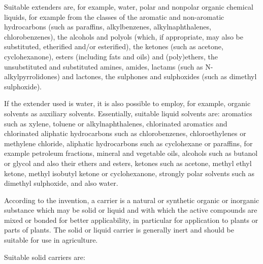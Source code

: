 \documentclass[11pt,a4paper]{article}
\begin{document}
Suitable extenders are, for example, water, polar and nonpolar organic chemical liquids, for example from the classes of the aromatic and non-aromatic hydrocarbons (such as paraffins, alkylbenzenes, alkylnaphthalenes, chlorobenzenes), the alcohols and polyols (which, if appropriate, may also be substituted, etherified and/or esterified), the ketones (such as acetone, cyclohexanone), esters (including fats and oils) and (poly)ethers, the unsubstituted and substituted amines, amides, lactams (such as N-alkylpyrrolidones) and lactones, the sulphones and sulphoxides (such as dimethyl sulphoxide).

If the extender used is water, it is also possible to employ, for example, organic solvents as auxiliary solvents. Essentially, suitable liquid solvents are: aromatics such as xylene, toluene or alkylnaphthalenes, chlorinated aromatics and chlorinated aliphatic hydrocarbons such as chlorobenzenes, chloroethylenes or methylene chloride, aliphatic hydrocarbons such as cyclohexane or paraffins, for example petroleum fractions, mineral and vegetable oils, alcohols such as butanol or glycol and also their ethers and esters, ketones such as acetone, methyl ethyl ketone, methyl isobutyl ketone or cyclohexanone, strongly polar solvents such as dimethyl sulphoxide, and also water.

According to the invention, a carrier is a natural or synthetic organic or inorganic substance which may be solid or liquid and with which the active compounds are mixed or bonded for better applicability, in particular for application to plants or parts of plants. The solid or liquid carrier is generally inert and should be suitable for use in agriculture.

Suitable solid carriers are:
\end{document}
